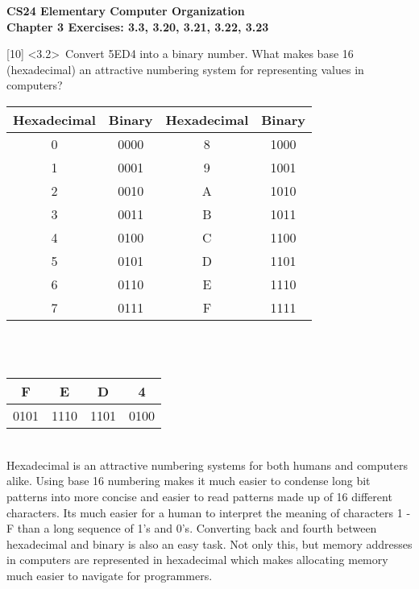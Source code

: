 \documentclass[12pt]{article}
\begin{document}
	\begin{center}
		\textbf{CS24 Elementary Computer Organization} \\
		\textbf{Chapter 3 Exercises: 3.3, 3.20, 3.21, 3.22, 3.23} \vspace{0.5cm}
	\end{center}
	
	
	
	\noindent {} 
	[10] \textless3.2\textgreater \ Convert 5ED4 into a binary number. What makes base 16 (hexadecimal) an attractive numbering system for representing values in computers? \\
	\begin{center}
		
		\begin{tabular}{ |c|c|c|c| } 
			\hline
			Hexadecimal & Binary & Hexadecimal & Binary  \\
			\hline
			0 & 0000 & 8 & 1000 \\ 
			\hline
			1 & 0001 & 9 & 1001 \\ 
			\hline
			2 & 0010 & A & 1010 \\ 
			\hline
			3 & 0011 & B & 1011 \\
			\hline
			4 & 0100 & C & 1100 \\ 
			\hline
			5 & 0101 & D & 1101 \\ 
			\hline
			6 & 0110 & E & 1110 \\
			\hline
			7 & 0111 & F & 1111 \\
			\hline
			
		\end{tabular}
		\vspace{0.8cm} \\
		 \vspace{0.3cm} \\
		
		\begin{tabular}{ |c|c|c|c| } 
		\hline
		F & E & D & 4 \\ 
		\hline
		0101 & 1110 & 1101 & 0100 \\ 
		\hline
		\end{tabular}
		\vspace{0.5cm}
		
		 \vspace{0.3cm} \\
		Hexadecimal is an attractive numbering systems for both humans and computers alike. Using base 16 numbering makes it much easier to condense long bit patterns into more concise and easier to read patterns made up of 16 different characters. Its much easier for a human to interpret the meaning of characters 1 - F than a long sequence of 1's and 0's. Converting back and fourth between hexadecimal and binary is also an easy task. Not only this, but memory addresses in computers are represented in hexadecimal which makes allocating memory much easier to navigate for programmers.
		
		
	\end{center}
	
\end{document}
